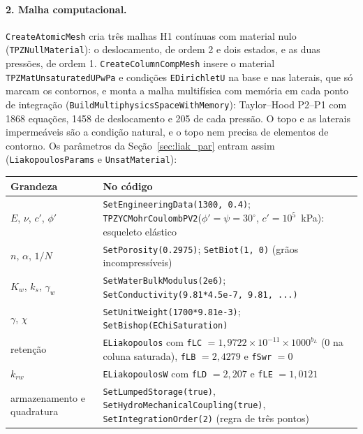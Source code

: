 \documentclass[11pt,a4paper]{article}
\begin{document}
\paragraph{2. Malha computacional.} \texttt{CreateAtomicMesh} cria três malhas H1 contínuas com
material nulo (\texttt{TPZNullMaterial}): o deslocamento, de ordem 2 e dois estados, e as duas
pressões, de ordem 1. \texttt{CreateColumnCompMesh} insere o material
\texttt{TPZMatUnsaturatedUPwPa} e condições \texttt{EDirichletU} na base e nas laterais, que só
marcam os contornos, e monta a malha multifísica com memória em cada ponto de integração
(\texttt{BuildMultiphysicsSpaceWithMemory}): Taylor--Hood P2--P1 com 1868 equações, 1458 de
deslocamento e 205 de cada pressão. O topo e as laterais impermeáveis são a condição natural, e o topo nem
precisa de elementos de contorno. Os parâmetros da Seção~\ref{sec:liak_par} entram assim
(\texttt{LiakopoulosParams} e \texttt{UnsatMaterial}):

\begin{center}\small
\begin{tabularx}{\textwidth}{@{}>{\raggedright\arraybackslash}p{3.5cm} >{\raggedright\arraybackslash}X@{}}
\toprule
Grandeza & No código\\
\midrule
$E$, $\nu$, $c'$, $\phi'$ & \texttt{SetEngineeringData(1300, 0.4)};
  \texttt{TPZYCMohrCoulombPV2}($\phi'=\psi=30^\circ$, $c'=10^5$~kPa): esqueleto elástico\\
$n$, $\alpha$, $1/N$ & \texttt{SetPorosity(0.2975)}; \texttt{SetBiot(1, 0)} (grãos incompressíveis)\\
$K_w$, $k_s$, $\gamma_w$ & \texttt{SetWaterBulkModulus(2e6)};
  \texttt{SetConductivity(9.81*4.5e-7, 9.81, ...)}\\
$\gamma$, $\chi$ & \texttt{SetUnitWeight(1700*9.81e-3)}; \texttt{SetBishop(EChiSaturation)}\\
retenção & \texttt{ELiakopoulos} com \texttt{fLC} $=1{,}9722\times10^{-11}\times1000^{b_L}$
  ($0$ na coluna saturada), \texttt{fLB} $=2{,}4279$ e \texttt{fSwr} $=0$\\
$k_{rw}$ & \texttt{ELiakopoulosW} com \texttt{fLD} $=2{,}207$ e \texttt{fLE} $=1{,}0121$\\
armazenamento e quadratura & \texttt{SetLumpedStorage(true)}, \texttt{SetHydroMechanicalCoupling(true)},
  \texttt{SetIntegrationOrder(2)} (regra de três pontos)\\
\bottomrule
\end{tabularx}
\end{center}
\end{document}
